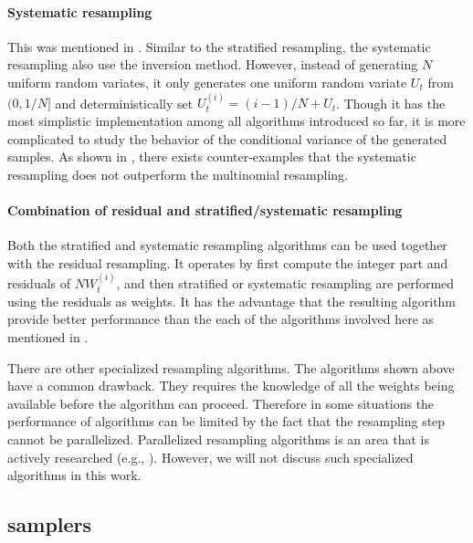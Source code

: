 \paragraph{Systematic resampling} This was mentioned in \cite{Whitley:1994vx}.
Similar to the stratified resampling, the systematic resampling also use the
inversion method. However, instead of generating $N$ uniform random variates,
it only generates one uniform random variate $U_t$ from $(0, 1/N]$ and
deterministically set $U_t^{(i)} = (i - 1)/N + U_t$. Though it has the most
simplistic implementation among all algorithms introduced so far, it is more
complicated to study the behavior of the conditional variance of the generated
samples. As shown in \cite{Douc:2005wa}, there exists counter-examples that
the systematic resampling does not outperform the multinomial resampling.

\paragraph{Combination of residual and stratified/systematic resampling} Both
the stratified and systematic resampling algorithms can be used together with
the residual resampling. It operates by first compute the integer part and
residuals of $NW_t^{(i)}$, and then stratified or systematic resampling are
performed using the residuals as weights. It has the advantage that the
resulting algorithm provide better performance than the each of the algorithms
involved here as mentioned in \cite{Douc:2005wa}.

There are other specialized resampling algorithms. The algorithms shown above
have a common drawback. They requires the knowledge of all the weights being
available before the algorithm can proceed. Therefore in some situations the
performance of \smc algorithms can be limited by the fact that the resampling
step cannot be parallelized. Parallelized resampling algorithms is an area
that is actively researched (e.g., \cite{Jun:2011vx}). However, we will not
discuss such specialized algorithms in this work.


\subsection[SMC samplers]{\protect\smc samplers}
\label{sub:SMC Samplers}

